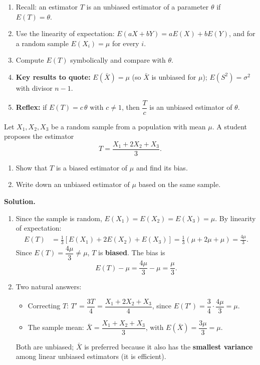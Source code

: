 \documentclass[11pt]{article}
\newcommand{\cle}[1]{{\popxbold\color{popdark}#1}}
\begin{document}
\begin{methode}
\begin{enumerate}
\item Recall: an estimator $T$ is an \cle{unbiased estimator} of a parameter $\theta$ if $E(T)=\theta$.
\item Use the linearity of expectation: $E(aX+bY)=aE(X)+bE(Y)$, and for a random sample $E(X_i)=\mu$ for every $i$.
\item Compute $E(T)$ symbolically and compare with $\theta$.
\item \textbf{Key results to quote:} $E(\bar{X})=\mu$ (so $\bar X$ is unbiased for $\mu$); $E(S^2)=\sigma^2$ with divisor $n-1$.
\item \textbf{Reflex:} if $E(T)=c\,\theta$ with $c\neq 1$, then $\dfrac{T}{c}$ is an unbiased estimator of $\theta$.
\end{enumerate}
\end{methode}

\begin{exoresolu}
Let $X_1, X_2, X_3$ be a random sample from a population with mean $\mu$. A student proposes the estimator
\[
T=\frac{X_1+2X_2+X_3}{3}.
\]
\begin{enumerate}
\item Show that $T$ is a biased estimator of $\mu$ and find its bias.
\item Write down an unbiased estimator of $\mu$ based on the same sample.
\end{enumerate}
\tcblower
\textbf{Solution.}
\begin{enumerate}
\item Since the sample is random, $E(X_1)=E(X_2)=E(X_3)=\mu$. By linearity of expectation:
\begin{align*}
E(T) &= \frac{1}{3}\left[E(X_1)+2E(X_2)+E(X_3)\right]
= \frac{1}{3}\left(\mu+2\mu+\mu\right)
= \frac{4\mu}{3}.
\end{align*}
Since $E(T)=\dfrac{4\mu}{3}\neq\mu$, $T$ is \textbf{biased}. The bias is
\[
E(T)-\mu=\frac{4\mu}{3}-\mu=\frac{\mu}{3}.
\]
\item Two natural answers:
\begin{itemize}
\item Correcting $T$: $T'=\dfrac{3T}{4}=\dfrac{X_1+2X_2+X_3}{4}$, since $E(T')=\dfrac{3}{4}\cdot\dfrac{4\mu}{3}=\mu$.
\item The sample mean: $\bar{X}=\dfrac{X_1+X_2+X_3}{3}$, with $E(\bar{X})=\dfrac{3\mu}{3}=\mu$.
\end{itemize}
Both are unbiased; $\bar X$ is preferred because it also has the \textbf{smallest variance} among linear unbiased estimators (it is efficient).
\end{enumerate}
\end{exoresolu}
\end{document}
